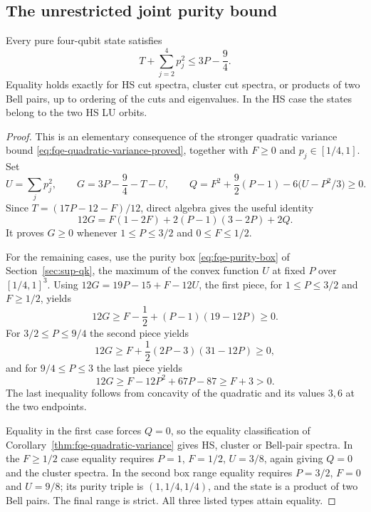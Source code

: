 \subsection{The unrestricted joint purity bound}\label{sec:fqe-joint-purity}

\begin{theorem}
\label{thm:fqe-joint-purity}
Every pure four-qubit state satisfies
\[
\boxed{\qquad T+\sum_{j=2}^4p_j^2\le3P-\frac94.\qquad}
\tag{JV}\label{eq:fqe-joint-purity}
\]
Equality holds exactly for HS cut spectra, cluster cut spectra, or products
of two Bell pairs, up to ordering of the cuts and eigenvalues.
In the HS case the states belong to the two HS LU orbits.
\end{theorem}
\begin{proof}
This is an elementary consequence of the stronger quadratic variance bound
\eqref{eq:fqe-quadratic-variance-proved}, together with $F\ge0$ and
$p_j\in[1/4,1]$. Set
\[
U=\sum_jp_j^2,\qquad G=3P-\frac94-T-U,\qquad
Q=F^2+\frac92(P-1)-6\bigl(U-P^2/3\bigr)\ge0.
\]
Since $T=(17P-12-F)/12$, direct algebra gives the useful identity
\[
12G=F(1-2F)+2(P-1)(3-2P)+2Q.
\tag{JI}\label{eq:fqe-joint-implication}
\]
It proves $G\ge0$ whenever $1\le P\le3/2$ and $0\le F\le1/2$.

For the remaining cases, use the purity box \eqref{eq:fqe-purity-box} of Section~\ref{sec:sup-qk}, the
maximum of the convex function $U$ at fixed $P$ over $[1/4,1]^3$.
Using $12G=19P-15+F-12U$, the first piece, for
$1\le P\le3/2$ and $F\ge1/2$, yields
\[
12G\ge F-\frac12+(P-1)(19-12P)\ge0.
\]
For $3/2\le P\le9/4$ the second piece yields
\[
12G\ge F+\frac12(2P-3)(31-12P)\ge0,
\]
and for $9/4\le P\le3$ the last piece yields
\[
12G\ge F-12P^2+67P-87\ge F+3>0.
\]
The last inequality follows from concavity of the quadratic and its
values $3,6$ at the two endpoints.

Equality in the first case forces $Q=0$, so the equality classification of
Corollary~\ref{thm:fqe-quadratic-variance} gives HS, cluster or Bell-pair
spectra. In the $F\ge1/2$ case equality requires
$P=1$, $F=1/2$, $U=3/8$, again giving $Q=0$ and the cluster
spectra. In the second box range equality requires
$P=3/2$, $F=0$ and $U=9/8$; its purity triple is
$(1,1/4,1/4)$, and the state is a product of two Bell pairs.
The final range is strict. All three listed types attain equality.
\end{proof}

